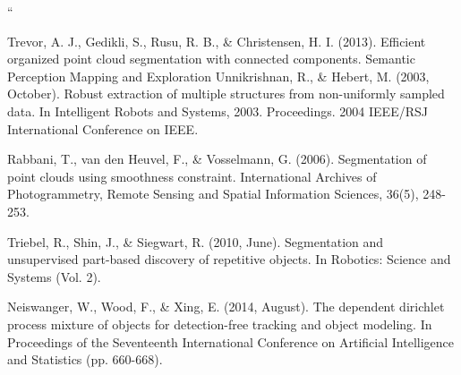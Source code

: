 \documentclass[]{article}
\begin{document}
\begin{thebibliography}{99}


            ``

            \newblock Trevor, A. J., Gedikli, S., Rusu, R. B., \& Christensen, H. I. (2013). Efficient organized point cloud segmentation with connected components. Semantic Perception Mapping and Exploration
            \newblock Unnikrishnan, R., \& Hebert, M. (2003, October). Robust extraction of multiple structures from non-uniformly sampled data. In Intelligent Robots and Systems, 2003. Proceedings. 2004 IEEE/RSJ International Conference on IEEE. 

            \newblock Rabbani, T., van den Heuvel, F., \& Vosselmann, G. (2006). Segmentation of point clouds using smoothness constraint. International Archives of Photogrammetry, Remote Sensing and Spatial Information Sciences, 36(5), 248-253.

            \newblock Triebel, R., Shin, J., \& Siegwart, R. (2010, June). Segmentation and unsupervised part-based discovery of repetitive objects. In Robotics: Science and Systems (Vol. 2).

            \newblock Neiswanger, W., Wood, F., \& Xing, E. (2014, August). The dependent dirichlet process mixture of objects for detection-free tracking and object modeling. In Proceedings of the Seventeenth International Conference on Artificial Intelligence and Statistics (pp. 660-668).


\end{thebibliography}
\end{document}

